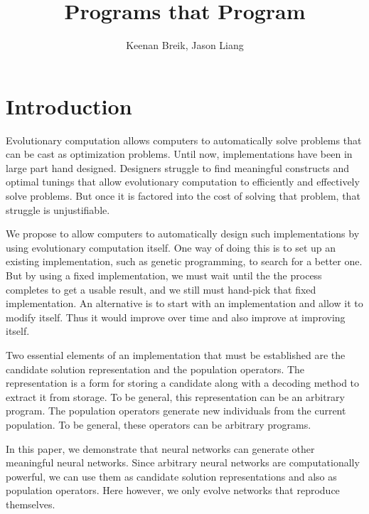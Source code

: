 \documentclass[12pt]{article}
\begin{document}
\title{Programs that Program}

\author{Keenan Breik, Jason Liang}
\date{}
\maketitle

\begin{abstract}
\end{abstract}

\section{Introduction}
\label{intro}

Evolutionary computation allows computers
to automatically solve problems
that can be cast as optimization problems.
Until now, implementations have been
in large part hand designed.
Designers struggle to find meaningful constructs
and optimal tunings that allow evolutionary computation
to efficiently and effectively solve problems.
But once it is factored into the cost
of solving that problem,
that struggle is unjustifiable.

We propose to allow computers
to automatically design such implementations
by using evolutionary computation itself.
One way of doing this is to set up
an existing implementation,
such as genetic programming,
to search for a better one.
But by using a fixed implementation,
we must wait until the the process completes
to get a usable result,
and we still must hand-pick that fixed implementation.
An alternative is to start with an implementation
and allow it to modify itself.
Thus it would improve over time
and also improve at improving itself.

Two essential elements of an implementation
that must be established
are the candidate solution representation
and the population operators.
The representation is a form for storing a candidate
along with a decoding method
to extract it from storage.
To be general,
this representation can be an arbitrary program.
The population operators
generate new individuals from the current population.
To be general,
these operators can be arbitrary programs.

In this paper,
we demonstrate that neural networks
can generate other meaningful neural networks.
Since arbitrary neural networks are computationally powerful,%
\cite{sperduti1997netpower}
we can use them as candidate solution representations
and also as population operators.
Here however,
we only evolve networks
that reproduce themselves.
\end{document}
